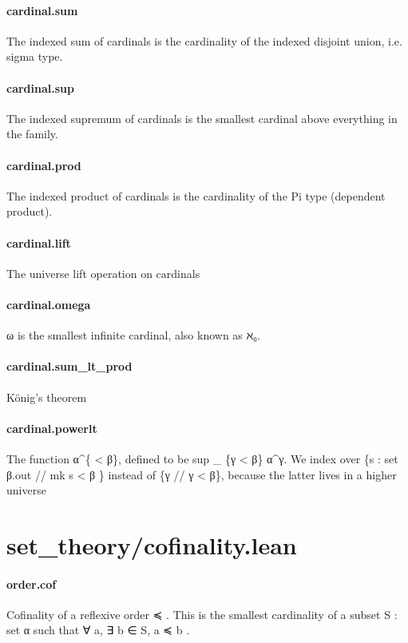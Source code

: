 \documentclass{article}
\begin{document}
\paragraph{cardinal.sum}
\par
The indexed sum of cardinals is the cardinality of the
indexed disjoint union, i.e. sigma type.
\paragraph{cardinal.sup}
\par
The indexed supremum of cardinals is the smallest cardinal above
everything in the family.
\paragraph{cardinal.prod}
\par
The indexed product of cardinals is the cardinality of the Pi type
(dependent product).
\paragraph{cardinal.lift}
\par
The universe lift operation on cardinals
\paragraph{cardinal.omega}
\par
\colorbox[RGB]{253,246,227}{{{{\color[RGB]{101, 123, 131} ω }}}} is the smallest infinite cardinal, also known as ℵ₀.
\paragraph{cardinal.sum\_lt\_prod}
\par
König's theorem
\paragraph{cardinal.powerlt}
\par
The function α\textasciicircum{}\{
<
β\}, defined to be sup
\_
\{γ 
<
 β\} α\textasciicircum{}γ.
We index over \{s : set β.out // mk s 
<
 β \} instead of \{γ // γ 
<
 β\}, because the latter lives in a
higher universe
\section{set\_theory/cofinality.lean}\paragraph{order.cof}
\par
Cofinality of a reflexive order 
\colorbox[RGB]{253,246,227}{{{{\color[RGB]{101, 123, 131} ≼ }}}}. This is the smallest cardinality
of a subset 
\colorbox[RGB]{253,246,227}{{{{\color[RGB]{101, 123, 131} S : set α }}}} such that 
\colorbox[RGB]{253,246,227}{{{{\color[RGB]{101, 123, 131} ∀ a, ∃ b ∈ S, a ≼ b }}}}.
\end{document}
